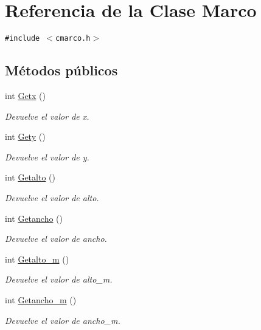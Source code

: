 \hypertarget{class_marco}{
\section{Referencia de la Clase Marco}
\label{class_marco}
}
{\tt \#include $<$cmarco.h$>$}

\subsection*{Métodos públicos}
\begin{CompactItemize}
\item 
int \hyperlink{class_marco_2dca8a6f891be78f7a54798a3baa2665}{Getx} ()
\begin{CompactList}\small\item\em Devuelve el valor de x. \item\end{CompactList}\item 
int \hyperlink{class_marco_075db8ed5a143de9ff1d82c75a79c55a}{Gety} ()
\begin{CompactList}\small\item\em Devuelve el valor de y. \item\end{CompactList}\item 
int \hyperlink{class_marco_f13fbd8bc2ea4555581c1c7739519184}{Getalto} ()
\begin{CompactList}\small\item\em Devuelve el valor de alto. \item\end{CompactList}\item 
int \hyperlink{class_marco_ba1d30d14a08d67e48bb99c894fc3e78}{Getancho} ()
\begin{CompactList}\small\item\em Devuelve el valor de ancho. \item\end{CompactList}\item 
int \hyperlink{class_marco_b455df2241cf007082274fb98afdb40b}{Getalto\_\-m} ()
\begin{CompactList}\small\item\em Devuelve el valor de alto\_\-m. \item\end{CompactList}\item 
int \hyperlink{class_marco_9a77bdba78c4e8551be782eb98fcb3ec}{Getancho\_\-m} ()
\begin{CompactList}\small\item\em Devuelve el valor de ancho\_\-m. \item\end{CompactList}\item 

\end{CompactItemize}
